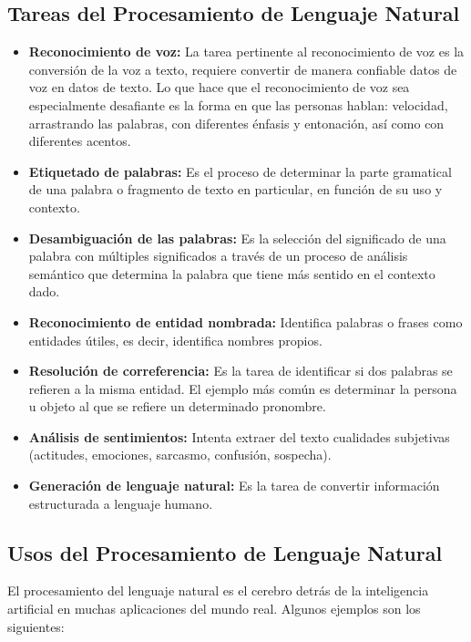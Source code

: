 \documentclass[12pt, a4paper, titlepage]{report}
\begin{document}
		        \subsection{Tareas del Procesamiento de Lenguaje Natural}
		        \begin{itemize}
		        	\item \textbf{Reconocimiento de voz: }La tarea pertinente al reconocimiento de voz es la conversión de la voz a texto, requiere convertir de manera confiable datos de voz en datos de texto. Lo que hace que el reconocimiento de voz sea especialmente desafiante es la forma en que las personas hablan: velocidad, arrastrando las palabras, con diferentes énfasis y entonación, así como con diferentes acentos.
		        	\item \textbf{Etiquetado de palabras: }Es el proceso de determinar la parte gramatical de una palabra o fragmento de texto en particular, en función de su uso y contexto.
		        	\item \textbf{Desambiguación de las palabras: }Es la selección del significado de una palabra con múltiples significados a través de un proceso de análisis semántico que determina la palabra que tiene más sentido en el contexto dado. 
		        	\item \textbf{Reconocimiento de entidad nombrada: }Identifica palabras o frases como entidades útiles, es decir, identifica nombres propios.
		        	\item \textbf{Resolución de correferencia: }Es la tarea de identificar si dos palabras se refieren a la misma entidad. El ejemplo más común es determinar la persona u objeto al que se refiere un determinado pronombre.
		        	\item \textbf{Análisis de sentimientos: }Intenta extraer del texto cualidades subjetivas (actitudes, emociones, sarcasmo, confusión, sospecha).
		        	\item \textbf{Generación de lenguaje natural: }Es la tarea de convertir información estructurada a lenguaje humano.
		        \end{itemize} 
		    
		    	\subsection{Usos del Procesamiento de Lenguaje Natural}
		    	
		    	El procesamiento del lenguaje natural es el cerebro detrás de la inteligencia artificial en muchas aplicaciones del mundo real. Algunos ejemplos son los siguientes:
		    	
\end{document}
